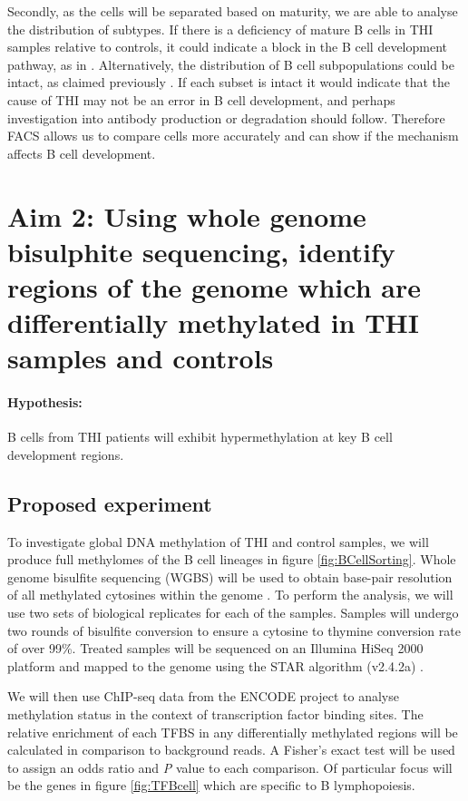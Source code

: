 \documentclass[12pt]{article}
\begin{document}
			Secondly, as the cells will be separated based on maturity, we are able to analyse the distribution of subtypes. 
			If there is a deficiency of mature B cells in THI samples relative to controls, it could indicate a block in the B cell development pathway, as in \citet{Tallmadge15}.
			Alternatively, the distribution of B cell subpopulations could be intact, as claimed previously \citep{Tiller78,Stiemh80,Siegel81,Buckley83,Fiorilli86,Dressler89}.
			If each subset is intact it would indicate that the cause of THI may not be an error in B cell development, and perhaps investigation into antibody production or degradation should follow. 
			Therefore FACS allows us to compare cells more accurately and can show if the mechanism affects B cell development.
			
	\newpage
	\section{Aim 2: {\large Using whole genome bisulphite sequencing, identify regions of the genome which are differentially methylated in THI samples and controls}}
	
		\paragraph{Hypothesis:} B cells from THI patients will exhibit hypermethylation at key B cell development regions.
		
		\subsection{Proposed experiment}
		
			To investigate global DNA methylation of THI and control samples, we will produce full methylomes of the B cell lineages in figure \ref{fig:BCellSorting}. 
			Whole genome bisulfite sequencing (WGBS) will be used to obtain base-pair resolution of all methylated cytosines within the genome \citep{Kulis15,Oakes16}. 
			To perform the analysis, we will use two sets of biological replicates for each of the samples. 
			Samples will undergo two rounds of bisulfite conversion to ensure a cytosine to thymine conversion rate of over 99\%.
			Treated samples will be sequenced on an Illumina HiSeq 2000 platform and mapped to the genome using the STAR algorithm (v2.4.2a) \citep{Dobin13}.
			
			We will then use ChIP-seq data from the ENCODE project \citep{ENCODE-Project-Consortium12} to analyse methylation status in the context of transcription factor binding sites.
			The relative enrichment of each TFBS in any differentially methylated regions will be calculated in comparison to background reads. 
			A Fisher's exact test will be used to assign an odds ratio and \textit{P} value to each comparison. 
			Of particular focus will be the genes in figure \ref{fig:TFBcell} which are specific to B lymphopoiesis.
\end{document}
